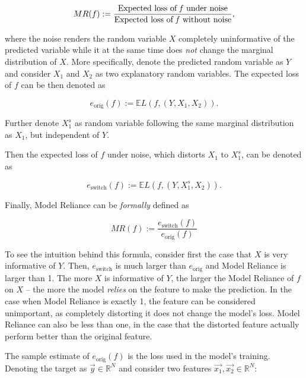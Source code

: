 		\begin{equation}
			MR(f):=\frac{\text{Expected loss of \textit{f} under noise}}{\text{Expected loss of \textit{f} without noise}},
		\end{equation}
		
		where the noise renders the random variable $X$ completely uninformative of the predicted variable while it at the same time does \textit{not} change the marginal distribution of $X$. More specifically, denote the predicted random variable as $Y$ and consider $X_1$ and $X_2$ as two explanatory random variables. The expected loss of $f$ can be then denoted as 
		
		\begin{equation}
			e_{\text{orig}}(f):= \mathbb{E} L(f,(Y,X_1, X_2)).
		\end{equation} 
		
		Further denote $X_1^s$ as random variable following the same marginal distribution as $X_1$, but independent of $Y$. 
		
		Then the expected loss of $f$ under noise, which distorts $X_1$ to $X_1^s$, can be denoted as 
		
		\begin{equation}
			e_{\text{switch}}(f):= \mathbb{E} L(f,(Y,X_1^s, X_2)).
		\end{equation} 
		
		Finally, Model Reliance can be \textit{formally} defined as 
		
		\begin{equation}
			MR(f):=\frac{e_{\text{switch}}(f)}{e_{\text{orig}}(f)}
		\end{equation}
		
		To see the intuition behind this formula, consider first the case that $X$ is very informative of $Y$. Then, 	$e_{\text{switch}}$ is much larger than $e_{\text{orig}}$ and Model Reliance is larger than 1. The more $X$ is informative of $Y$, the larger the  Model Reliance of $f$ on $X$ – the more the model \textit{relies} on the feature to make the prediction. In the case when Model Reliance is exactly 1, the feature can be considered unimportant, as completely distorting it does not change the model's loss. Model Reliance can also be less than one, in the case that the distorted feature actually perform better than the original feature.
				
		The sample estimate of $e_{\text{orig}}(f)$ is the loss used in the model's training. Denoting the target as $\vec{y} \in \mathbb{R}^N$ and consider two features $\vec{x_1}, \vec{x_2} \in \mathbb{R}^{N}$:
		
